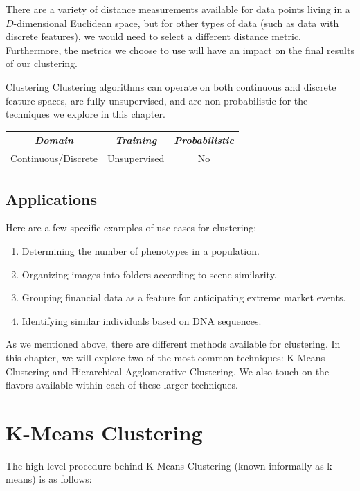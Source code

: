 There are a variety of distance measurements available for data points living in a $D$-dimensional Euclidean space, but for other types of data (such as data with discrete features), we would need to select a different distance metric. Furthermore, the metrics we choose to use will have an impact on the final results of our clustering.

\begin{mlcube}{Clustering}
Clustering algorithms can operate on both continuous and discrete feature spaces, are fully unsupervised, and are non-probabilistic for the techniques we explore in this chapter.
\begin{center}
    \begin{tabular}{c|c|c}
    \textit{\textbf{Domain}} & \textit{\textbf{Training}} & \textit{\textbf{Probabilistic}} \\
    \hline
    Continuous/Discrete & Unsupervised & No \\
    \end{tabular}
\end{center}
\end{mlcube}

\subsection{Applications}
Here are a few specific examples of use cases for clustering:

\begin{enumerate}
    \item Determining the number of phenotypes in a population.
    \item Organizing images into folders according to scene similarity.
    \item Grouping financial data as a feature for anticipating extreme market events.
    \item Identifying similar individuals based on DNA sequences.
\end{enumerate}

As we mentioned above, there are different methods available for clustering. In this chapter, we will explore two of the most common techniques: K-Means Clustering and Hierarchical Agglomerative Clustering. We also touch on the flavors available within each of these larger techniques.

\section{K-Means Clustering}
The high level procedure behind K-Means Clustering (known informally as k-means) is as follows:

